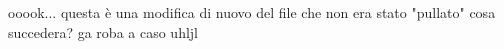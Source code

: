 \usepackage{pdfcomment}


    ooook... questa è una modifica di nuovo del file che non era stato "pullato" cosa succedera?
ga    roba a caso 
uhljl
    
